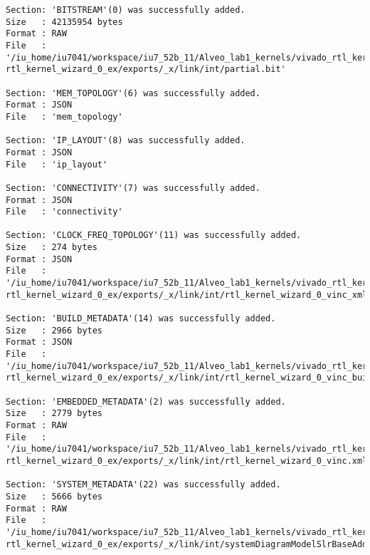 \begin{lstlisting}[label=code:log_file, caption=Содержимое log-файла, basicstyle=\tiny]
Section: 'BITSTREAM'(0) was successfully added.
Size   : 42135954 bytes
Format : RAW
File   : '/iu_home/iu7041/workspace/iu7_52b_11/Alveo_lab1_kernels/vivado_rtl_kernel/ rtl_kernel_wizard_0_ex/exports/_x/link/int/partial.bit'

Section: 'MEM_TOPOLOGY'(6) was successfully added.
Format : JSON
File   : 'mem_topology'

Section: 'IP_LAYOUT'(8) was successfully added.
Format : JSON
File   : 'ip_layout'

Section: 'CONNECTIVITY'(7) was successfully added.
Format : JSON
File   : 'connectivity'

Section: 'CLOCK_FREQ_TOPOLOGY'(11) was successfully added.
Size   : 274 bytes
Format : JSON
File   : '/iu_home/iu7041/workspace/iu7_52b_11/Alveo_lab1_kernels/vivado_rtl_kernel/ rtl_kernel_wizard_0_ex/exports/_x/link/int/rtl_kernel_wizard_0_vinc_xml.rtd'

Section: 'BUILD_METADATA'(14) was successfully added.
Size   : 2966 bytes
Format : JSON
File   : '/iu_home/iu7041/workspace/iu7_52b_11/Alveo_lab1_kernels/vivado_rtl_kernel/ rtl_kernel_wizard_0_ex/exports/_x/link/int/rtl_kernel_wizard_0_vinc_build.rtd'

Section: 'EMBEDDED_METADATA'(2) was successfully added.
Size   : 2779 bytes
Format : RAW
File   : '/iu_home/iu7041/workspace/iu7_52b_11/Alveo_lab1_kernels/vivado_rtl_kernel/ rtl_kernel_wizard_0_ex/exports/_x/link/int/rtl_kernel_wizard_0_vinc.xml'

Section: 'SYSTEM_METADATA'(22) was successfully added.
Size   : 5666 bytes
Format : RAW
File   : '/iu_home/iu7041/workspace/iu7_52b_11/Alveo_lab1_kernels/vivado_rtl_kernel/ rtl_kernel_wizard_0_ex/exports/_x/link/int/systemDiagramModelSlrBaseAddress.json'


\end{lstlisting}
